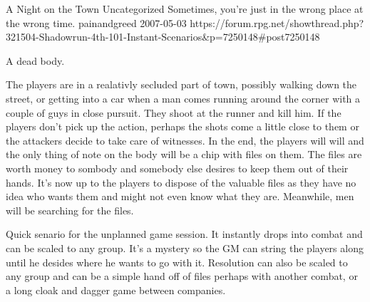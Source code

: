 \begin{scenario}{A Night on the Town}
	{Uncategorized}
	{Sometimes, you're just in the wrong place at the wrong time.}
	{painandgreed}
	{2007-05-03}
	{https://forum.rpg.net/showthread.php?321504-Shadowrun-4th-101-Instant-Scenarios\&p=7250148#post7250148}

 A dead body.

\synopsis  The players are in a realativly secluded part of town, possibly walking down the street, or getting into a car when a man comes running around the corner with a couple of guys in close pursuit. They shoot at the runner and kill him. If the players don't pick up the action, perhaps the shots come a little close to them or the attackers decide to take care of witnesses. In the end, the players will will and the only thing of note on the body will be a chip with files on them. The files are worth money to sombody and somebody else desires to keep them out of their hands. It's now up to the players to dispose of the valuable files as they have no idea who wants them and might not even know what they are. Meanwhile, men will be searching for the files.

\notes  Quick senario for the unplanned game session. It instantly drops into combat and can be scaled to any group. It's a mystery so the GM can string the players along until he desides where he wants to go with it. Resolution can also be scaled to any group and can be a simple hand off of files perhaps with another combat, or a long cloak and dagger game between companies.

\end{scenario}